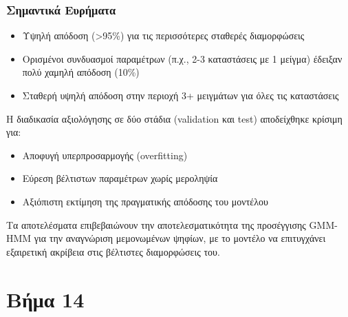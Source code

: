 \documentclass[a4paper,12pt]{article}
\begin{document}
\subsubsection*{Σημαντικά Ευρήματα}
\begin{itemize}
    \item Υψηλή απόδοση (>95\%) για τις περισσότερες σταθερές διαμορφώσεις
    \item Ορισμένοι συνδυασμοί παραμέτρων (π.χ., 2-3 καταστάσεις με 1 μείγμα) έδειξαν πολύ χαμηλή απόδοση (10\%)
    \item Σταθερή υψηλή απόδοση στην περιοχή 3+ μειγμάτων για όλες τις καταστάσεις
\end{itemize}

Η διαδικασία αξιολόγησης σε δύο στάδια (validation και test) αποδείχθηκε κρίσιμη για:
\begin{itemize}
    \item Αποφυγή υπερπροσαρμογής (overfitting)
    \item Εύρεση βέλτιστων παραμέτρων χωρίς μεροληψία
    \item Αξιόπιστη εκτίμηση της πραγματικής απόδοσης του μοντέλου
\end{itemize}

Τα αποτελέσματα επιβεβαιώνουν την αποτελεσματικότητα της προσέγγισης GMM-HMM για την αναγνώριση μεμονωμένων ψηφίων, 
με το μοντέλο να επιτυγχάνει εξαιρετική ακρίβεια στις βέλτιστες διαμορφώσεις του.

\section*{Βήμα 14}





\end{document}
